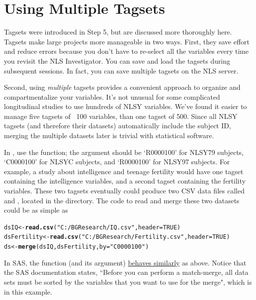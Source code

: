\documentclass{article}\usepackage[]{graphicx}\usepackage[]{color}
\makeatletter
\newcommand{\hlnum}[1]{\textcolor[rgb]{0.686,0.059,0.569}{#1}}%
\newcommand{\hlstr}[1]{\textcolor[rgb]{0.192,0.494,0.8}{#1}}%
\newcommand{\hlstd}[1]{\textcolor[rgb]{0.345,0.345,0.345}{#1}}%
\newcommand{\hlkwb}[1]{\textcolor[rgb]{0.69,0.353,0.396}{#1}}%
\newcommand{\hlkwc}[1]{\textcolor[rgb]{0.333,0.667,0.333}{#1}}%
\newcommand{\hlkwd}[1]{\textcolor[rgb]{0.737,0.353,0.396}{\textbf{#1}}}%
\newenvironment{kframe}{%
 \def\at@end@of@kframe{}%
 \ifinner\ifhmode%
  \def\at@end@of@kframe{\end{minipage}}%
  \begin{minipage}{\columnwidth}%
 \fi\fi%
 \def\FrameCommand##1{\hskip\@totalleftmargin \hskip-\fboxsep
 \colorbox{shadecolor}{##1}\hskip-\fboxsep
     \hskip-\linewidth \hskip-\@totalleftmargin \hskip\columnwidth}%
 \MakeFramed {\advance\hsize-\width
   \@totalleftmargin\z@ \linewidth\hsize
   \@setminipage}}%
 {\par\unskip\endMakeFramed%
 \at@end@of@kframe}
\newenvironment{knitrout}{}{} %
\makeatother
\begin{document}
\section{Using Multiple Tagsets}
Tagsets were introduced in Step 5, but are discussed more thoroughly here.  Tagsets make large projects more manageable in two ways.  First, they save effort and reduce errors because you don't have to re-select all the variables every time you revisit the NLS Investigator.  You can save and load the tagsets during subsequent sessions.  In fact, you can save multiple tagsets on the NLS server.

Second, using \emph{multiple} tagsets provides a convenient approach to organize and compartmentalize your variables.  It's not unusual for some complicated longitudinal studies to use hundreds of NLSY variables.  We've found it easier to manage five tagsets of ~100 variables, than one tagset of 500.  Since all NLSY tagsets (and therefore their datasets) automatically include the subject ID, merging the multiple datasets later is trivial with statistical software. 

In \R{}, use the  function; the  argument should be `R0000100' for NLSY79 subjects,  `C0000100' for NLSYC subjects, and `R0000100' for NLSY97 subjects.  For example, a study about intelligence and teenage fertility would have one tagset containing the intelligence variables, and a second tagset containing the fertility variables.  These two tagsets eventually could produce two CSV data files called  and , located in the  directory.  The \R{} code to read and merge these two datasets could be as simple as

\begin{knitrout}
\color{fgcolor}\begin{kframe}
\begin{alltt}
\hlstd{dsIQ} \hlkwb{<-} \hlkwd{read.csv}\hlstd{(}\hlstr{"C:/BGResearch/IQ.csv"}\hlstd{,} \hlkwc{header} \hlstd{=} \hlnum{TRUE}\hlstd{)}
\hlstd{dsFertility} \hlkwb{<-} \hlkwd{read.csv}\hlstd{(}\hlstr{"C:/BGResearch/Fertility.csv"}\hlstd{,} \hlkwc{header} \hlstd{=} \hlnum{TRUE}\hlstd{)}
\hlstd{ds} \hlkwb{<-} \hlkwd{merge}\hlstd{(dsIQ, dsFertility,} \hlkwc{by} \hlstd{=} \hlstr{"C0000100"}\hlstd{)}
\end{alltt}
\end{kframe}
\end{knitrout}


In SAS, the  function (and its  argument) \href{http://support.sas.com/documentation/cdl/en/basess/58133/HTML/default/viewer.htm#a001318494.htm}{behaves similarly} as above.  Notice that the SAS documentation states, ``Before you can perform a match-merge, all data sets must be sorted by the variables that you want to use for the merge", which is  in this example.
\end{document}
